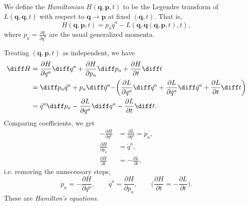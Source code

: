 \documentclass[12pt]{article}
\begin{document}
We define the \emph{Hamiltonian} $H(\mathbf{q}, \mathbf{p}, t)$ to be the Legendre transform of $L(\mathbf{q}, \mathbf{\dot q}, t)$ with respect to $\mathbf{\dot q} \to \mathbf{p}$ at fixed $(\mathbf{q}, t)$. That is,
\[
H(\mathbf{q}, \mathbf{p}, t) = p_a \dot q^a - L(\mathbf{q}, \mathbf{\dot q}(\mathbf{q}, \mathbf{p}, t), t),
\]
where $p_a = \frac{\partial L}{\partial \dot q^a}$ are the usual generalized momenta.

Treating $(\mathbf{q}, \mathbf{p}, t)$ as independent, we have
\begin{align*}
	\diff H &= \frac{\partial H}{\partial q^a} \diff q^a + \frac{\partial H}{\partial p_a} \diff p_a + \frac{\partial H}{\partial t} \diff t \\
		&= \diff p_a \dot q^a + p_a \diff \dot q^a - \biggr( \frac{\partial L}{\partial q^a} \diff q^a + \frac{\partial L}{\partial \dot q^a} \diff \dot q^a + \frac{\partial L}{\partial t} \diff t \biggr) \\
		&= \dot q^a \diff p_a - \frac{\partial L}{\partial q^a} \diff q^a - \frac{\partial L}{\partial t} \diff t.
\end{align*}
Comparing coefficients, we get
\begin{align*}
	- \frac{\partial H}{\partial q^a} &= \frac{\partial L}{\partial q^a} = \dot p_a, \\
	\frac{\partial H}{\partial p_a} &= \dot q^a, \\
	\frac{\partial H}{\partial t} &= - \frac{\partial L}{\partial t},
\end{align*}
i.e. removing the unnecessary steps,
\[
\dot p_a = - \frac{\partial H}{\partial q^a}, \qquad \dot q^a = \frac{\partial H}{\partial p_a}, \qquad \biggl( \frac{\partial H}{\partial t} = - \frac{\partial L}{\partial t} \biggr).
\]
These are \emph{Hamilton's equations}.
\end{document}
